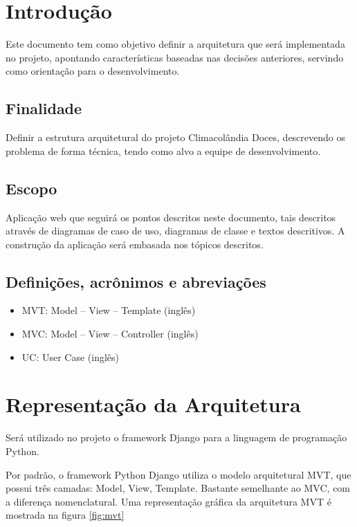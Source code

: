 \section{Introdução}

Este documento tem como objetivo definir a arquitetura que será implementada no projeto, apontando características baseadas nas decisões anteriores, servindo como orientação para o desenvolvimento. 

\subsection{Finalidade}

Definir a estrutura arquitetural do projeto Climacolândia Doces, descrevendo os problema de forma técnica, tendo como alvo a equipe de desenvolvimento.

\subsection{Escopo}

Aplicação web que seguirá os pontos descritos neste documento, tais descritos através de diagramas de caso de uso, diagramas de classe e textos descritivos. A construção da aplicação será embasada nos tópicos descritos.

\subsection{Definições, acrônimos e abreviações}

\begin{itemize}
	\item MVT: Model -- View -- Template (inglês)
	\item MVC: Model -- View -- Controller (inglês)
	\item UC: User Case (inglês)		
\end{itemize}

\section{Representação da Arquitetura}

Será utilizado no projeto o framework Django para a linguagem de programação Python.

Por padrão, o framework Python Django utiliza o modelo arquitetural MVT, que possui três camadas: Model, View, Template. Bastante semelhante ao MVC, com a diferença nomenclatural. Uma representação gráfica da arquitetura MVT é mostrada na figura \ref{fig:mvt}

